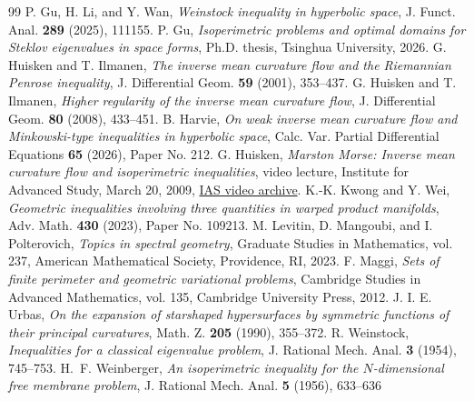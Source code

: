 \documentclass[10pt,a4paper]{amsart}
\numberwithin{equation}{section}
\begin{document}
\begin{thebibliography}{99}
 P. Gu, H. Li, and Y. Wan, \emph{Weinstock inequality in hyperbolic space}, J. Funct. Anal. \textbf{289} (2025), 111155.
 P. Gu, \emph{Isoperimetric problems and optimal domains for Steklov eigenvalues in space forms}, Ph.D. thesis, Tsinghua University, 2026.
 G. Huisken and T. Ilmanen, \emph{The inverse mean curvature flow and the Riemannian Penrose inequality}, J. Differential Geom. \textbf{59} (2001), 353--437.
 G. Huisken and T. Ilmanen, \emph{Higher regularity of the inverse mean curvature flow}, J. Differential Geom. \textbf{80} (2008), 433--451.
 B. Harvie, \emph{On weak inverse mean curvature flow and Minkowski-type inequalities in hyperbolic space}, Calc. Var. Partial Differential Equations \textbf{65} (2026), Paper No. 212. %
 G. Huisken, \emph{Marston Morse: Inverse mean curvature flow and isoperimetric inequalities}, video lecture, Institute for Advanced Study, March 20, 2009, \href{https://www.ias.edu/video/marston-morse-inverse-mean-curvature-flow-and-isoperimetric-inequalities}{IAS video archive}.
 K.-K. Kwong and Y. Wei, \emph{Geometric inequalities involving three quantities in warped product manifolds}, Adv. Math. \textbf{430} (2023), Paper No. 109213.
 M. Levitin, D. Mangoubi, and I. Polterovich, \emph{Topics in spectral geometry}, Graduate Studies in Mathematics, vol. 237, American Mathematical Society, Providence, RI, 2023.
 F. Maggi, \emph{Sets of finite perimeter and geometric variational problems}, Cambridge Studies in Advanced Mathematics, vol. 135, Cambridge University Press, 2012.
 J. I. E. Urbas, \emph{On the expansion of starshaped hypersurfaces by symmetric functions of their principal curvatures}, Math. Z. \textbf{205} (1990), 355--372.
 R. Weinstock, \emph{Inequalities for a classical eigenvalue problem}, J. Rational Mech. Anal. \textbf{3} (1954), 745--753.
 H.~F. Weinberger, \emph{An isoperimetric inequality for the $N$-dimensional free membrane problem}, J. Rational Mech. Anal. {\bf 5} (1956), 633--636
\end{thebibliography}
\end{document}
